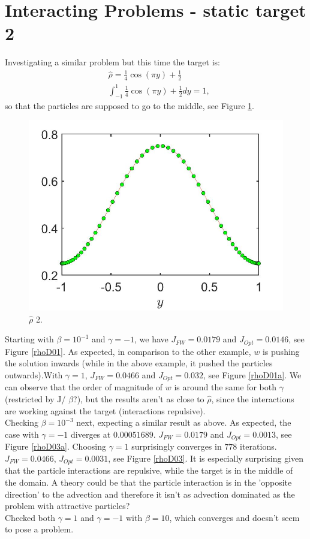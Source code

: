 \documentclass[11pt, a4paper]{article}
\theoremstyle{definition}
\begin{document}
\section{Interacting Problems - static target 2}
Investigating a similar problem but this time the target is:
\begin{align*}
&\hat \rho = \frac{1}{4}\cos(\pi y) + \frac{1}{2}\\
&\int_{-1}^{1}\frac{1}{4}\cos(\pi y) + \frac{1}{2}dy =1,
\end{align*}
so that the particles are supposed to go to the middle, see Figure \ref{rhoHat2}.
\begin{figure}[h]
	\includegraphics[scale=0.3]{rhoHat2.jpg}	
	\caption{$\hat \rho$ 2.}
	\label{rhoHat2}
\end{figure}

Starting with $\beta = 10^{-1}$ and $\gamma = - 1$, we have $J_{FW}= 0.0179$ and $J_{Opt}=0.0146$, see Figure \ref{rhoD01}. As expected, in comparison to the other example, $w$ is pushing the solution inwards (while in the above example, it pushed the particles outwards).With $\gamma = 1$, $J_{FW}= 0.0466$ and $J_{Opt} = 0.032$, see Figure \ref{rhoD01a}. We can observe that the order of magnitude of $w$ is around the same for both $\gamma$ (restricted by J/ $\beta$?), but the results aren't as close to $\hat \rho$, since the interactions are working against the target (interactions repulsive).\\
Checking $\beta = 10^{-3}$ next, expecting a similar result as above. As expected, the case with $\gamma = - 1$ diverges at $0.00051689$. $J_{FW}= 0.0179$ and $J_{Opt}= 0.0013$, see Figure \ref{rhoD03a}. Choosing $\gamma = 1$ surprisingly converges in $778$ iterations. $J_{FW} = 0.0466$, $J_{Opt} = 0.0031$, see Figure \ref{rhoD03}. It is especially surprising given that the particle interactions are repulsive, while the target is in the middle of the domain. A theory could be that the particle interaction is in the 'opposite direction' to the advection and therefore it isn't as advection dominated as the problem with attractive particles?\\
Checked both $\gamma =1$ and $\gamma = -1$ with $\beta = 10$, which converges and doesn't seem to pose a problem.
\end{document}
